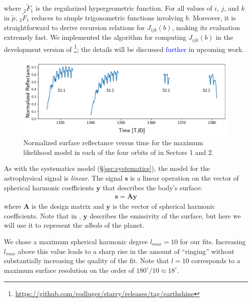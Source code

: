 \documentclass[modern]{aastex62}
\newcommand{\edited}[1]{\textcolor{blue}{#1}}
\begin{document}
%
where ${_2\tilde{F}_1}$ is the regularized hypergeometric function. For all values
of $i$, $j$, and $k$ in $\tilde{p}$, ${_2\tilde{F}_1}$ reduces to simple
trigonometric functions involving $b$. Moreover, it is straightforward to
derive recursion relations for $J_{ijk}(b)$, making its evaluation extremely fast.
We implemented the algorithm for computing $J_{ijk}(b)$ in the development version
of \starry
\footnote{\url{https://github.com/rodluger/starry/releases/tag/earthshine}};
the details will be discussed \edited{further} in upcoming work.

\begin{figure}[t!]
    \begin{centering}
    \includegraphics[width=\linewidth]{figures/starry_model.pdf}
    \caption{\label{fig:starry_model}
             Normalized surface reflectance versus time for the maximum
             likelihood \starry model in each of the four orbits of \TESS
             in Sectors 1 and 2.
             }
    \end{centering}
\end{figure}

As with the systematics model (\S\ref{sec:systematics}), the model
for the astrophysical signal is \emph{linear}. The signal $\mathbf{s}$ 
is a linear operation on the vector of spherical harmonic coefficients 
$\mathbf{y}$
that describes the body's surface:
%
\begin{align}
    \mathbf{s} = \mathbf{A} \mathbf{y}
\end{align}
%
where $\mathbf{A}$ is the design matrix and $\mathbf{y}$ is the vector of spherical harmonic coefficients. 
Note that in \cite{Luger2019}, $\mathbf{y}$ describes the emissivity of the surface,
but here we will use it to represent the \emph{albedo} of the planet.

We chose a maximum spherical harmonic degree $l_{max} = 10$ for our fits.
Increasing $l_{max}$ above this value 
leads to a sharp rise in the amount of ``ringing'' without substantially
increasing the quality of the fit. Note that $l = 10$ corresponds to
a maximum surface resolution on the order of $180^\circ/10 \approx 18^\circ$.
\end{document}
